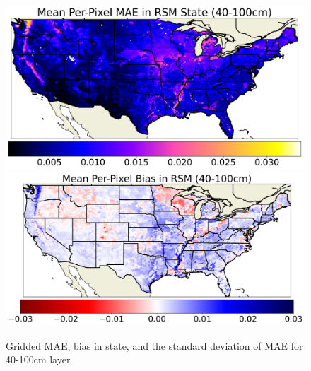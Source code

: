 \begin{figure}[hp!]
    \centering

    \includegraphics[width=.48\linewidth,draft=false]{figures/grid-eval_lstm-rsm-9_full/eval-grid_full_lstm-rsm-9_rsm-100_spatial-stats_abs-err_state-err-abs-mean.png}
    \includegraphics[width=.48\linewidth,draft=false]{figures/grid-eval_lstm-rsm-9_full/eval-grid_full_lstm-rsm-9_rsm-100_spatial-stats_bias_state-err-bias-mean.png}


    \caption{Gridded MAE, bias in state, and the standard deviation of MAE for 40-100cm layer}
    \label{lstm-rsm-9-grid-rsm-100}
\end{figure}
